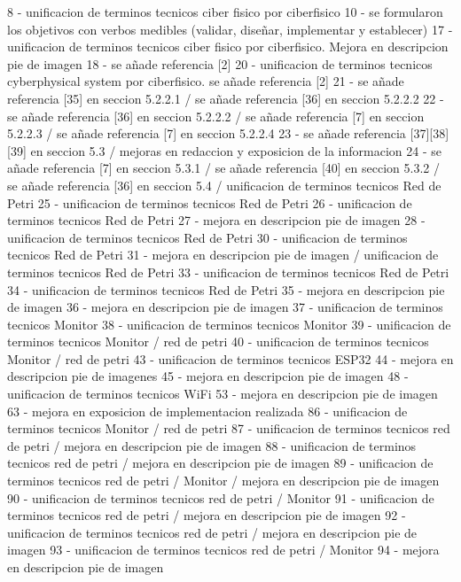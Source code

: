8   - unificacion de terminos tecnicos ciber fisico por ciberfisico
10  - se formularon los objetivos con verbos medibles (validar, diseñar, implementar y establecer)
17  - unificacion de terminos tecnicos ciber fisico por ciberfisico. Mejora en descripcion pie de imagen
18  - se añade referencia [2]
20  - unificacion de terminos tecnicos cyberphysical system por ciberfisico. se añade referencia [2]
21  - se añade referencia [35] en seccion 5.2.2.1 / se añade referencia [36] en seccion 5.2.2.2
22  - se añade referencia [36] en seccion 5.2.2.2 / se añade referencia [7] en seccion 5.2.2.3 / se añade referencia [7] en seccion 5.2.2.4
23  - se añade referencia [37][38][39] en seccion 5.3 / mejoras en redaccion y exposicion de la informacion
24  - se añade referencia [7] en seccion 5.3.1 / se añade referencia [40] en seccion 5.3.2 /  se añade referencia [36] en seccion 5.4 / unificacion de terminos tecnicos Red de Petri
25  - unificacion de terminos tecnicos Red de Petri
26  - unificacion de terminos tecnicos Red de Petri
27  - mejora en descripcion pie de imagen
28  - unificacion de terminos tecnicos Red de Petri
30  - unificacion de terminos tecnicos Red de Petri
31  - mejora en descripcion pie de imagen / unificacion de terminos tecnicos Red de Petri
33  - unificacion de terminos tecnicos Red de Petri
34  - unificacion de terminos tecnicos Red de Petri
35  - mejora en descripcion pie de imagen
36  - mejora en descripcion pie de imagen
37  - unificacion de terminos tecnicos Monitor
38  - unificacion de terminos tecnicos Monitor
39  - unificacion de terminos tecnicos Monitor / red de petri
40  - unificacion de terminos tecnicos Monitor / red de petri
43  - unificacion de terminos tecnicos ESP32
44  - mejora en descripcion pie de imagenes
45  - mejora en descripcion pie de imagen
48  - unificacion de terminos tecnicos WiFi
53  - mejora en descripcion pie de imagen
63  - mejora en exposicion de implementacion realizada
86  - unificacion de terminos tecnicos Monitor / red de petri
87  - unificacion de terminos tecnicos red de petri / mejora en descripcion pie de imagen
88  - unificacion de terminos tecnicos red de petri / mejora en descripcion pie de imagen
89  - unificacion de terminos tecnicos red de petri / Monitor / mejora en descripcion pie de imagen
90  - unificacion de terminos tecnicos red de petri / Monitor
91  - unificacion de terminos tecnicos red de petri / mejora en descripcion pie de imagen
92  - unificacion de terminos tecnicos red de petri / mejora en descripcion pie de imagen
93  - unificacion de terminos tecnicos red de petri / Monitor
94  - mejora en descripcion pie de imagen
